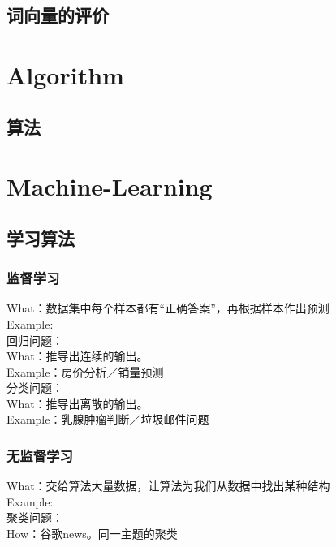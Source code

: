 \documentclass[
10pt, %
a4paper, %
oneside, %
headinclude,footinclude, %
BCOR5mm, %
]{scrartcl}
\begin{document}
\subsection{词向量的评价}
{\let\thefootnote\relax{}}

\newpage 

\section{Algorithm}



\subsection{算法}

\newpage 
\section{Machine-Learning}
\subsection{\color{red}学习算法}
\subsubsection{\color{blue}监督学习}
What：数据集中每个样本都有“正确答案”，再根据样本作出预测
\\Example:\\\indent 回归问题：\\\indent \indent What：推导出连续的输出。\\\indent \indent Example：房价分析／销量预测
\\\indent 分类问题：\\\indent \indent What：推导出离散的输出。\\\indent \indent Example：乳腺肿瘤判断／垃圾邮件问题
\subsubsection{\color{blue}无监督学习}
What：交给算法大量数据，让算法为我们从数据中找出某种结构
\\Example:\\\indent 聚类问题：\\\indent \indent How：谷歌news。同一主题的聚类
\end{document}
